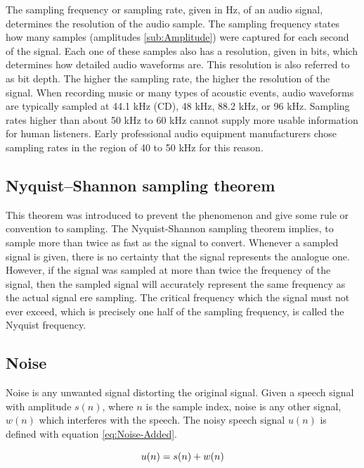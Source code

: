 The sampling frequency or sampling rate, given in \gls{Hz}, of an audio signal, determines the resolution of the audio sample. The sampling frequency states how many samples (amplitudes \ref{sub:Amplitude}) were captured for each second of the signal. Each one of these samples also has a resolution, given in bits, which determines how detailed audio waveforms are. This resolution is also referred to as bit depth. The higher the sampling rate, the higher the resolution of the signal. When recording music or many types of acoustic events, audio waveforms are typically sampled at 44.1 \gls{kHz} (CD), 48 \gls{kHz}, 88.2 \gls{kHz}, or 96 \gls{kHz}. Sampling rates higher than about 50 \gls{kHz} to 60 \gls{kHz} cannot supply more usable information for human listeners. Early professional audio equipment manufacturers chose sampling rates in the region of 40 to 50 \gls{kHz} for this reason.

\subsection{Nyquist–Shannon sampling theorem}
\label{sub:Nyquist–Shannon}

This theorem was introduced to prevent the  phenomenon and give some rule or convention to sampling. The Nyquist-Shannon sampling theorem implies, to sample more than twice as fast as the signal to convert.
\newline
\newline
Whenever a sampled signal is given, there is no certainty that the signal represents the analogue one. However, if the signal was sampled at more than twice the frequency of the signal, then the sampled signal will accurately represent the same frequency as the actual signal ere sampling. The critical frequency which the signal must not ever exceed, which is precisely one half of the sampling frequency, is called the Nyquist frequency.

\subsection{Noise}
\label{sub:Noise}

Noise is any unwanted signal distorting the original signal. Given a speech signal with amplitude $s(n)$, where $n$ is the sample index, noise is any other signal, $w(n)$ which interferes with the speech. The noisy speech signal $u(n)$ is defined with equation \ref{eq:Noise-Added}.

\begin{equation}
    \centering
    u(n) = s(n) + w(n)
    \label{eq:Noise-Added}
\end{equation}

